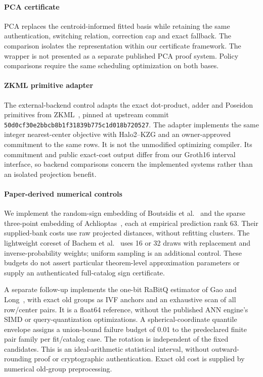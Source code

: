 \paragraph{PCA certificate}
PCA replaces the centroid-informed fitted basis while retaining the same
authentication, switching relation, correction cap and exact fallback.
The comparison isolates the representation within our certificate framework.
The wrapper is not presented as a separate published PCA proof system.
Policy comparisons require the same scheduling optimization on both bases.

\paragraph{ZKML primitive adapter}
The external-backend control adapts the exact dot-product, adder and Poseidon
primitives from ZKML~\cite{chen2024zkml}, pinned at upstream commit
\texttt{50d0cf30e2bbcb8b1f31839b775c1d018b720527}. The adapter implements
the same integer nearest-center objective with Halo2--KZG and an
owner-approved commitment to the same rows. It is not the unmodified
optimizing compiler. Its commitment and public exact-cost output differ
from our Groth16 interval interface, so backend comparisons concern the
implemented systems rather than an isolated projection benefit.

\paragraph{Paper-derived numerical controls}
We implement the random-sign embedding of Boutsidis et
al.~\cite{boutsidis2010random} and the sparse three-point embedding of
Achlioptas~\cite{achlioptas2003database}, each at empirical prediction rank
63. Their supplied-bank costs use raw projected distances, without refitting
clusters. The lightweight coreset of Bachem et
al.~\cite{bachem2018scalable} uses 16 or 32 draws with replacement and
inverse-probability weights; uniform sampling is an additional control.
These budgets do not assert particular theorem-level approximation
parameters or supply an authenticated full-catalog sign certificate.

A separate follow-up implements the one-bit RaBitQ estimator of Gao and
Long~\cite{gao2024rabitq}, with exact old groups as IVF anchors and an
exhaustive scan of all row/center pairs. It is a float64 reference, without
the published ANN engine's SIMD or query-quantization optimizations. A
spherical-coordinate quantile envelope assigns a union-bound failure
budget of 0.01 to the predeclared finite pair family per fit/catalog case.
The rotation is independent of the fixed candidates. This is an
ideal-arithmetic statistical interval, without outward-rounding proof or
cryptographic authentication. Exact old cost is supplied by numerical
old-group preprocessing.

